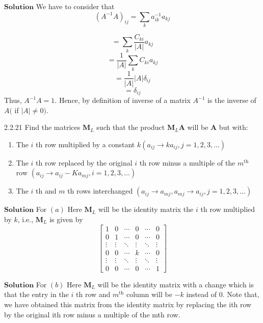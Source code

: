 \documentclass{article}
\begin{document}
\begin{flushleft}
$\boxed{\textbf{Solution}}$ We have to consider that
$$
\left(A^{-1} A\right)_{i j}=\sum_{k} a_{i k}^{-1} a_{k j}
$$

$$=\sum_{k} \frac{C_{k i}}{|A|} a_{k j}$$
$$=\frac{1}{|A|} \sum_{k} C_{k i} a_{k j}$$
$$=\frac{1}{|A|}|A| \delta_{i j}$$
$$=\delta_{i j}$$
Thus, $A^{-1} A=1$. Hence, by definition of inverse of a matrix $A^{-1}$ is the inverse of $A($ if $|A| \neq 0)$. 









\begin{mybox}{2.2.21}
Find the matrices $\mathbf{M}_{L}$ such that the product $\mathbf{M}_{L} \mathbf{A}$ will be $\mathbf{A}$ but with:
\begin{enumerate}[$(a)$]
\item The $i$ th row multiplied by a constant $k\left(a_{i j} \rightarrow k a_{i j}, j=1,2,3, \ldots\right)$
\item The $i$ th row replaced by the original $i$ th row minus a multiple of the $m^{\text{th}}$ row
$\left(a_{i j} \rightarrow a_{i j}-K a_{m j}, i=1,2,3, \ldots\right)$
\item The $i$ th and $m$ th rows interchanged $\left(a_{i j} \rightarrow a_{m j}, a_{m j} \rightarrow a_{i j}, j=1,2,3, \ldots\right)$

\end{enumerate}
\end{mybox}

$\boxed{\textbf{Solution}}$  For $(a)$ Here $\mathbf{M}_{L}$ will be the identity matrix the $i$ th row multiplied by $k$, i.e., $\mathbf{M}_{L}$ is given by
$$\begin{bmatrix}{1} & {0} & {\cdots} & {0} & {\cdots} & {0} \\ {0} & {1} & {\cdots} & {0} & {\cdots} & {0} \\ {\vdots} & {\vdots} & {\ddots} & {\vdots} & {\ddots} & {\vdots} \\ {0} & {0} & {\cdots} & {k} & {\cdots} & {0} \\ {\vdots} & {\vdots} & {\ddots} & {\vdots} & {\ddots} & {\vdots} \\ {0} & {0} & {\cdots} & {0} & {\cdots} & {1}\end{bmatrix}$$

$\boxed{\textbf{Solution}}$ For $(b)$ Here $\mathbf{M}_{L}$ will be the identity matrix with a change which is that the entry in the $i$ th row and $m^{\text{th}}$ column will be $-k$ instead of $0$. Note that, we have obtained this matrix from the identity matrix by replacing the ith row by the original ith row minus a multiple of the mth row.


\end{flushleft}
\end{document}

